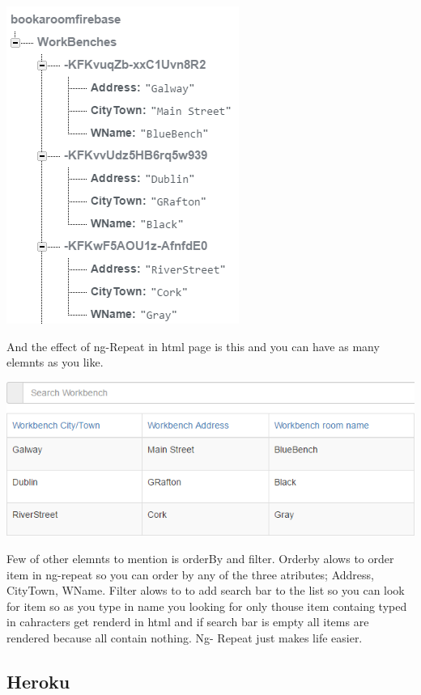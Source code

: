 \begin{center}    
	\includegraphics{img/FirebaseLayout.png}
\end{center}
\bigbreak

And the effect of ng-Repeat in html page is this and you can have as many elemnts as you like.

\begin{center}    
\includegraphics{img/PrintOutHtml.png}
\end{center}
\bigbreak

Few of other elemnts to mention is orderBy and filter. Orderby alows to order item in ng-repeat so you can order by any of the three atributes; Address, CityTown, WName. Filter alows to to add search bar to the list so you can look for item so as you type in name you looking for only thouse item containg typed in cahracters get renderd in html and if search bar is empty all items are rendered because all contain nothing. Ng- Repeat just makes life easier.




\subsection{Heroku}
